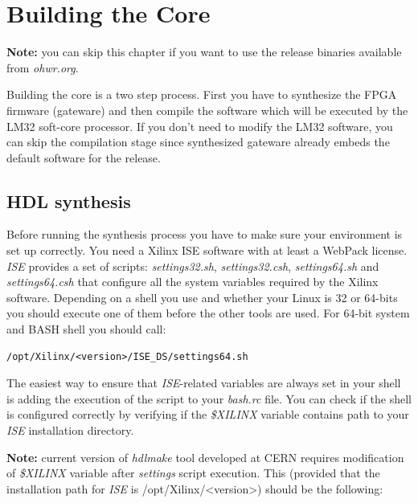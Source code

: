 \documentclass[a4paper, 12pt]{article}
\newcommand{\codeHook}[1]{\mbox{\ttfamily\MakeTextUppercase{#1}}}
\begin{document}
\section{Building the Core}

\textbf{Note:} you can skip this chapter if you want to use the release binaries
available from \textit{ohwr.org}.

\vspace{1em}
Building the core is a two step process. First you have to
synthesize the FPGA firmware (gateware) and then compile the software which
will be executed by the \codeHook{lm32} soft-core processor. If you don't need to
modify the \codeHook{lm32} software, you can skip the compilation stage since
synthesized gateware already embeds the default software for the release.

\label{HDL synthesis}
\subsection{HDL synthesis}

Before running the synthesis process you have to make sure your environment is
set up correctly. You need a Xilinx ISE software with at least a WebPack
license. \textit{ISE} provides a set of scripts: \textit{settings32.sh},
\textit{settings32.csh}, \textit{settings64.sh} and \textit{settings64.csh} that configure all
the system variables required by the Xilinx software. Depending on a shell you
use and whether your Linux is 32 or 64-bits you should execute one of them
before the other tools are used. For 64-bit system and BASH shell you should
call:
\begin{lstlisting}
/opt/Xilinx/<version>/ISE_DS/settings64.sh
\end{lstlisting}

The easiest way to ensure that \textit{ISE}-related variables are always set in your
shell is adding the execution of the script to your \textit{bash.rc} file. You can
check if the shell is configured correctly by verifying if the \textit{\$XILINX}
variable contains path to your \textit{ISE} installation directory.

\textbf{Note:} current version of \textit{hdlmake} tool developed at CERN requires
modification of \textit{\$XILINX} variable after \textit{settings} script execution.
This (provided that the installation path for \textit{ISE} is /opt/Xilinx/<version>)
should be the following:
\end{document}
